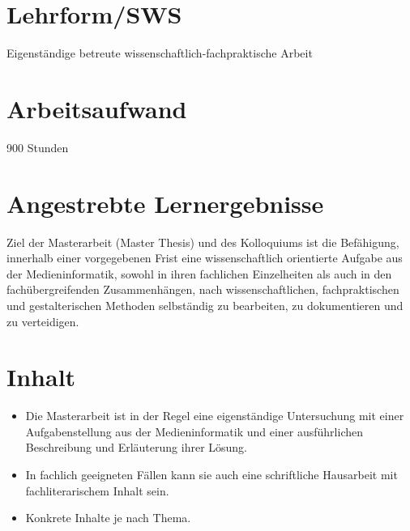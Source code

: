 \section*{Lehrform/SWS\label{/mi-2017/modulbeschreibungen-master/MA_All_Modul_Masterarbeit}}\label{lehrformswspathlabelmi-2017modulbeschreibungen-mastermaux5fallux5fmodulux5fmasterarbeit}

Eigenständige betreute wissenschaftlich-fachpraktische Arbeit

\section*{Arbeitsaufwand\label{/mi-2017/modulbeschreibungen-master/MA_All_Modul_Masterarbeit}}\label{arbeitsaufwandpathlabelmi-2017modulbeschreibungen-mastermaux5fallux5fmodulux5fmasterarbeit}

900 Stunden

\section*{Angestrebte
Lernergebnisse\label{/mi-2017/modulbeschreibungen-master/MA_All_Modul_Masterarbeit}}\label{angestrebte-lernergebnissepathlabelmi-2017modulbeschreibungen-mastermaux5fallux5fmodulux5fmasterarbeit}

Ziel der Masterarbeit (Master Thesis) und des Kolloquiums ist die
Befähigung, innerhalb einer vorgegebenen Frist eine wissenschaftlich
orientierte Aufgabe aus der Medieninformatik, sowohl in ihren fachlichen
Einzelheiten als auch in den fachübergreifenden Zusammenhängen, nach
wissenschaftlichen, fachpraktischen und gestalterischen Methoden
selbständig zu bearbeiten, zu dokumentieren und zu verteidigen.

\section*{Inhalt\label{/mi-2017/modulbeschreibungen-master/MA_All_Modul_Masterarbeit}}\label{inhaltpathlabelmi-2017modulbeschreibungen-mastermaux5fallux5fmodulux5fmasterarbeit}

\begin{itemize}
\tightlist
\item
  Die Masterarbeit ist in der Regel eine eigenständige Untersuchung mit
  einer Aufgabenstellung aus der Medieninformatik und einer
  ausführlichen Beschreibung und Erläuterung ihrer Lösung.
\item
  In fachlich geeigneten Fällen kann sie auch eine schriftliche
  Hausarbeit mit fachliterarischem Inhalt sein.
\item
  Konkrete Inhalte je nach Thema.
\end{itemize}

